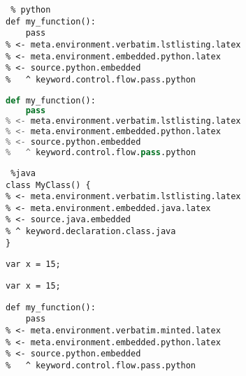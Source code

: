 \documentclass[12pt]{article}
\newcommand\"{quote}
\begin{document}

\begin{lstlisting} % python
def my_function():
    pass
% <- meta.environment.verbatim.lstlisting.latex
% <- meta.environment.embedded.python.latex
% <- source.python.embedded
%   ^ keyword.control.flow.pass.python
\end{lstlisting}

\begin{lstlisting}[frame=single,
                   language=python] %python
def my_function():
    pass
% <- meta.environment.verbatim.lstlisting.latex
% <- meta.environment.embedded.python.latex
% <- source.python.embedded
%   ^ keyword.control.flow.pass.python
\end{lstlisting}

\begin{lstlisting} %java
class MyClass() {
% <- meta.environment.verbatim.lstlisting.latex
% <- meta.environment.embedded.java.latex
% <- source.java.embedded
% ^ keyword.declaration.class.java
}
\end{lstlisting}

\lstinline{var x = 15;}

\lstinline|var x = 15;|



\begin{verbatim}
def my_function():
    pass
% <- meta.environment.verbatim.minted.latex
% <- meta.environment.embedded.python.latex
% <- source.python.embedded
%   ^ keyword.control.flow.pass.python
\end{verbatim}


\end{document}
